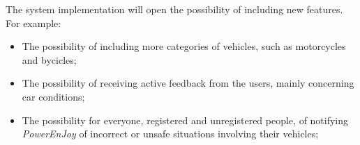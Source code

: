 The system implementation will open the possibility of including new features. For example:

\begin{itemize}
\item The possibility of including more categories of vehicles, such as motorcycles and bycicles;
\item The possibility of receiving active feedback from the users, mainly concerning car conditions;
\item The possibility for everyone, registered and unregistered people, of notifying \emph{PowerEnJoy} of incorrect or unsafe situations involving their vehicles;
\end{itemize}